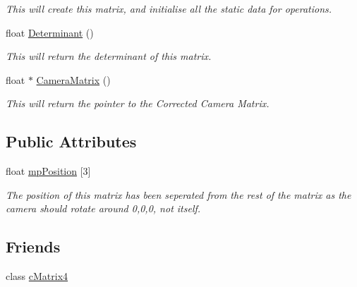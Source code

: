 \begin{DoxyCompactItemize}
\begin{DoxyCompactList}\small\item\em This will create this matrix, and initialise all the static data for operations. \end{DoxyCompactList}\item 
\hypertarget{classc_camera_matrix4_a4f3456fc67fbd37692a8daa9d11d5fc6}{
float \hyperlink{classc_camera_matrix4_a4f3456fc67fbd37692a8daa9d11d5fc6}{Determinant} ()}
\label{classc_camera_matrix4_a4f3456fc67fbd37692a8daa9d11d5fc6}

\begin{DoxyCompactList}\small\item\em This will return the determinant of this matrix. \end{DoxyCompactList}\item 
\hypertarget{classc_camera_matrix4_a8dc77d23773120d4f3161b3ebceddda6}{
float $\ast$ \hyperlink{classc_camera_matrix4_a8dc77d23773120d4f3161b3ebceddda6}{CameraMatrix} ()}
\label{classc_camera_matrix4_a8dc77d23773120d4f3161b3ebceddda6}

\begin{DoxyCompactList}\small\item\em This will return the pointer to the Corrected Camera Matrix. \end{DoxyCompactList}\end{DoxyCompactItemize}
\subsection*{Public Attributes}
\begin{DoxyCompactItemize}
\item 
\hypertarget{classc_camera_matrix4_afb48ac51e480abcece16e031d8bc300a}{
float \hyperlink{classc_camera_matrix4_afb48ac51e480abcece16e031d8bc300a}{mpPosition} \mbox{[}3\mbox{]}}
\label{classc_camera_matrix4_afb48ac51e480abcece16e031d8bc300a}

\begin{DoxyCompactList}\small\item\em The position of this matrix has been seperated from the rest of the matrix as the camera should rotate around 0,0,0, not itself. \end{DoxyCompactList}\end{DoxyCompactItemize}
\subsection*{Friends}
\begin{DoxyCompactItemize}
\item 
\hypertarget{classc_camera_matrix4_a9fe15ae517530a4ef2b8001131c522e3}{
class \hyperlink{classc_camera_matrix4_a9fe15ae517530a4ef2b8001131c522e3}{cMatrix4}}
\label{classc_camera_matrix4_a9fe15ae517530a4ef2b8001131c522e3}

\end{DoxyCompactItemize}


